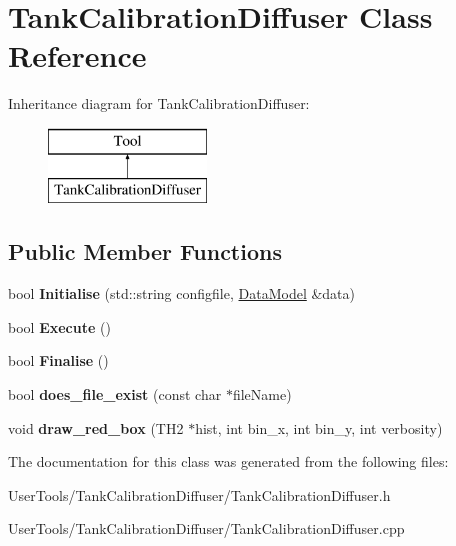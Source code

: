 \hypertarget{classTankCalibrationDiffuser}{\section{Tank\-Calibration\-Diffuser Class Reference}
\label{classTankCalibrationDiffuser}
}
Inheritance diagram for Tank\-Calibration\-Diffuser\-:\begin{figure}[H]
\begin{center}
\leavevmode
\includegraphics[height=2.000000cm]{classTankCalibrationDiffuser}
\end{center}
\end{figure}
\subsection*{Public Member Functions}
\begin{DoxyCompactItemize}
\item 
\hypertarget{classTankCalibrationDiffuser_a7238278dec1744e7ff2b9d429646d5a0}{bool {\bfseries Initialise} (std\-::string configfile, \hyperlink{classDataModel}{Data\-Model} \&data)}\label{classTankCalibrationDiffuser_a7238278dec1744e7ff2b9d429646d5a0}

\item 
\hypertarget{classTankCalibrationDiffuser_a5431ce6ae31c56e05ea582a1e7cc1b09}{bool {\bfseries Execute} ()}\label{classTankCalibrationDiffuser_a5431ce6ae31c56e05ea582a1e7cc1b09}

\item 
\hypertarget{classTankCalibrationDiffuser_a04a9fda76df45563f8b0af616d6d1c69}{bool {\bfseries Finalise} ()}\label{classTankCalibrationDiffuser_a04a9fda76df45563f8b0af616d6d1c69}

\item 
\hypertarget{classTankCalibrationDiffuser_a8f563cd1027d7632f5e61688ede35bd1}{bool {\bfseries does\-\_\-file\-\_\-exist} (const char $\ast$file\-Name)}\label{classTankCalibrationDiffuser_a8f563cd1027d7632f5e61688ede35bd1}

\item 
\hypertarget{classTankCalibrationDiffuser_a3b25eb8574a9c9146bab698c71edb573}{void {\bfseries draw\-\_\-red\-\_\-box} (T\-H2 $\ast$hist, int bin\-\_\-x, int bin\-\_\-y, int verbosity)}\label{classTankCalibrationDiffuser_a3b25eb8574a9c9146bab698c71edb573}

\end{DoxyCompactItemize}


The documentation for this class was generated from the following files\-:\begin{DoxyCompactItemize}
\item 
User\-Tools/\-Tank\-Calibration\-Diffuser/Tank\-Calibration\-Diffuser.\-h\item 
User\-Tools/\-Tank\-Calibration\-Diffuser/Tank\-Calibration\-Diffuser.\-cpp\end{DoxyCompactItemize}
